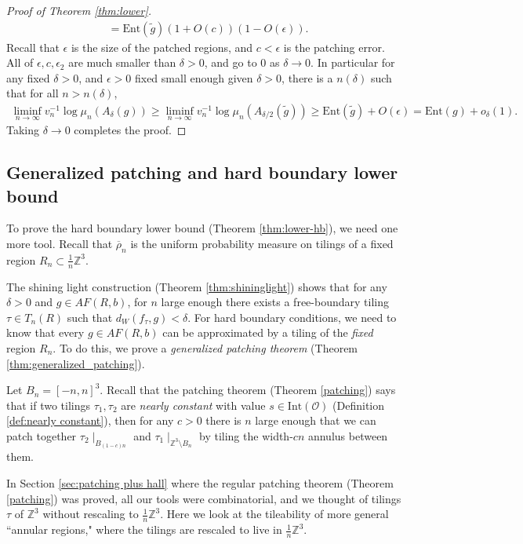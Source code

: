 \documentclass[11pt]{article}
\theoremstyle{remark}
\theoremstyle{definition}
\newcommand{\Ent}{\text{Ent}}
\newcommand{\mc}[1]{\mathcal{#1}}
\newcommand{\m}[1]{\mathbb{#1}}
\begin{document}
\begin{proof}[Proof of Theorem \ref{thm:lower}]
\begin{align*}
    &= \Ent(\widetilde g) (1+ O(c))(1-O(\epsilon)). 
\end{align*}
Recall that $\epsilon$ is the size of the patched regions, and $c<\epsilon$ is the patching error. All of $\epsilon,c,\epsilon_2$ are much smaller than $\delta>0$, and go to $0$ as $\delta\to 0$. In particular for any fixed $\delta>0$, and $\epsilon>0$ fixed small enough given $\delta>0$, there is a $n(\delta)$ such that for all $n>n(\delta)$, 
\begin{align*}
    \liminf_{n\to \infty} v_{n}^{-1}\log \mu_n(A_{\delta}(g)) \geq \liminf_{n\to \infty} v_{n}^{-1}\log \mu_n(A_{\delta/2}(\widetilde g)) \geq  \Ent(\widetilde g) + O(\epsilon) = \Ent(g) + o_\delta(1).
\end{align*}
Taking $\delta\to 0$ completes the proof.
\end{proof}

\subsection{Generalized patching and hard boundary lower bound}\label{sec:generalized_patching}

To prove the hard boundary lower bound (Theorem \ref{thm:lower-hb}), we need one more tool. Recall that $\overline{\rho}_n$ is the uniform probability measure on tilings of a fixed region $R_n\subset \frac{1}{n} \m Z^3$.

The shining light construction (Theorem \ref{thm:shininglight}) shows that for any $\delta>0$ and $g\in AF(R,b)$, for $n$ large enough there exists a free-boundary tiling $\tau\in T_n(R)$ such that $d_W(f_\tau,g)<\delta$. For hard boundary conditions, we need to know that every $g\in AF(R,b)$ can be approximated by a tiling of the \textit{fixed} region $R_n$. To do this, we prove a \textit{generalized patching theorem} (Theorem \ref{thm:generalized_patching}).

Let $B_n = [-n,n]^3$. Recall that the patching theorem (Theorem \ref{patching}) says that if two tilings $\tau_1,\tau_2$ are \textit{nearly constant} with value $s\in \text{Int}(\mc O)$ (Definition \ref{def:nearly constant}), then for any $c>0$ there is $n$ large enough that we can patch together $\tau_2\mid_{B_{(1-c)n}}$ and $\tau_1\mid_{\m Z^3\setminus B_n}$ by tiling the width-$c n$ annulus between them. 

In Section \ref{sec:patching plus hall} where the regular patching theorem (Theorem \ref{patching}) was proved, all our tools were combinatorial, and we thought of tilings $\tau$ of $\m Z^3$ without rescaling to $\frac{1}{n} \m Z^3$. Here we look at the tileability of more general ``annular regions," where the tilings are rescaled to live in $\frac{1}{n} \m Z^3$. 
\end{document}
